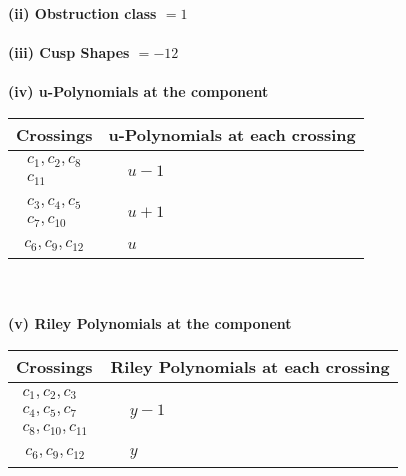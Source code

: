 \documentclass[1p]{elsarticle_modified}
\theoremstyle{definition}
\begin{document}
\flushleft \textbf{(ii) Obstruction class $= 1$}\\~\\
\flushleft \textbf{(iii) Cusp Shapes $= -12$}\\~\\
\newpage\renewcommand{\arraystretch}{1}
\flushleft \textbf{(iv) u-Polynomials at the component}\newline \\
\begin{tabular}{m{50pt}|m{274pt}}
Crossings & \hspace{64pt}u-Polynomials at each crossing \\
\hline $$\begin{aligned}c_{1},c_{2},c_{8}\\c_{11}\end{aligned}$$&$\begin{aligned}
&u-1
\end{aligned}$\\
\hline $$\begin{aligned}c_{3},c_{4},c_{5}\\c_{7},c_{10}\end{aligned}$$&$\begin{aligned}
&u+1
\end{aligned}$\\
\hline $$\begin{aligned}c_{6},c_{9},c_{12}\end{aligned}$$&$\begin{aligned}
&u
\end{aligned}$\\
\hline
\end{tabular}\\~\\
\newpage\renewcommand{\arraystretch}{1}
\flushleft \textbf{(v) Riley Polynomials at the component}\newline \\
\begin{tabular}{m{50pt}|m{274pt}}
Crossings & \hspace{64pt}Riley Polynomials at each crossing \\
\hline $$\begin{aligned}c_{1},c_{2},c_{3}\\c_{4},c_{5},c_{7}\\c_{8},c_{10},c_{11}\end{aligned}$$&$\begin{aligned}
&y-1
\end{aligned}$\\
\hline $$\begin{aligned}c_{6},c_{9},c_{12}\end{aligned}$$&$\begin{aligned}
&y
\end{aligned}$\\
\hline
\end{tabular}\\~\\
\end{document}
